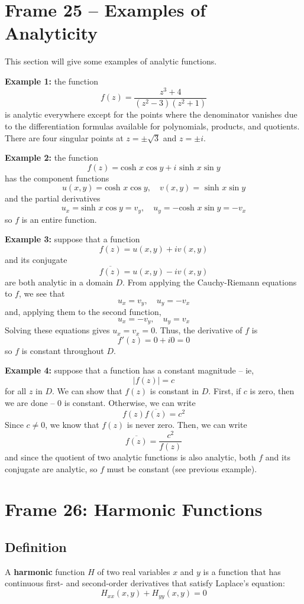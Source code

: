 \documentclass{article}
\renewcommand{\emph}{\textbf}
\renewcommand{\bar}{\overline}
\begin{document}
\clearpage
\section{Frame 25 -- Examples of Analyticity}
This section will give some examples of analytic functions.

\emph{Example 1:} the function
\[
	f(z) = \frac{z^3 + 4}{(z^2 - 3)(z^2 + 1)}
\]
is analytic everywhere except for the points where the denominator vanishes due to the differentiation formulas available for polynomials, products, and quotients. There are four singular points at $z = \pm \sqrt{3}$ and $z = \pm i$.

\emph{Example 2:} the function
\[
	f(z) = \text{cosh } x \cos y + i \text{ sinh } x \sin y
\]
has the component functions
\[
	u(x, y) = \text{cosh } x \cos y,	\quad	v(x, y) = \text{ sinh } x \sin y
\]
and the partial derivatives
\[
	u_x = \text{sinh } x \cos y = v_y,	\quad
	u_y = -\text{cosh } x \sin y = -v_x	
\]
so $f$ is an entire function.

\emph{Example 3:} suppose that a function
\[
	f(z) = u(x, y) + iv(x, y)
\]
and its conjugate
\[
	\bar{f(z)} = u(x, y) - iv(x, y)
\]
are both analytic in a domain $D$. From applying the Cauchy-Riemann equations to $f$, we see that
\[
	u_x = v_y,	\quad u_y = -v_x
\]
and, applying them to the second function,
\[
	u_x = -v_y,	\quad u_y = v_x
\]
Solving these equations gives $u_x = v_x = 0$. Thus, the derivative of $f$ is
\[
	f'(z) = 0 + i0 = 0
\]
so $f$ is constant throughout $D$.

\emph{Example 4:} suppose that a function has a constant magnitude -- ie,
\[
	|f(z)| = c
\]
for all $z$ in $D$. We can show that $f(z)$ is constant in $D$. First, if $c$ is zero, then we are done -- $0$ is constant. Otherwise, we can write
\[
	f(z) \bar{f(z)} = c^2
\]
Since $c \neq 0$, we know that $f(z)$ is never zero. Then, we can write
\[
	\bar{f(z)} = \frac{c^2}{f(z)}
\]
and since the quotient of two analytic functions is also analytic, both $f$ and its conjugate are analytic, so $f$ must be constant (see previous example).


\clearpage
\section{Frame 26: Harmonic Functions}
\subsection{Definition}
A \emph{harmonic} function $H$ of two real variables $x$ and $y$ is a function that has continuous first- and second-order derivatives that satisfy Laplace's equation:
\[
	H_{xx}(x, y) + H_{yy}(x, y) = 0
\]
\end{document}
